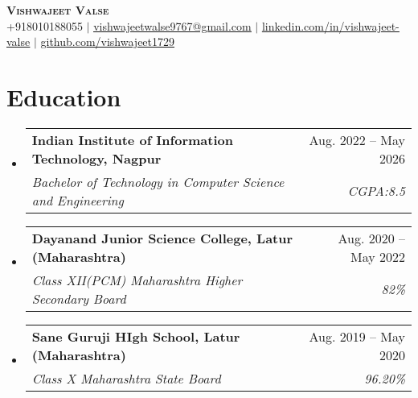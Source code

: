 \documentclass[letterpaper,11pt]{article}
\makeatletter
\newcommand{\resumeSubheading}[4]{
  \vspace{-2pt}\item
    \begin{tabular*}{0.97\textwidth}[t]{l@{\extracolsep{\fill}}r}
      \textbf{#1} & #2 \\
      \textit{\small#3} & \textit{\small #4} \\
    \end{tabular*}\vspace{-7pt}
}
\newcommand{\resumeSubHeadingListStart}{\begin{itemize}[leftmargin=0.15in, label={}]}
\newcommand{\resumeSubHeadingListEnd}{\end{itemize}}
\makeatother
\begin{document}

\begin{center}
    \textbf{\Huge \scshape Vishwajeet Valse} \\ \vspace{1pt}
    \small +918010188055 $|$ \href{mailto:vishwajeetwalse9767@gmail.com}{\underline{vishwajeetwalse9767@gmail.com}} $|$ 
    \href{https://linkedin.com/in/vishwajeet-valse-a17a94253}{\underline{linkedin.com/in/vishwajeet-valse}} $|$
    \href{https://github.com/vishwajeet1729}{\underline{github.com/vishwajeet1729}}
\end{center}


\section{Education}
  \resumeSubHeadingListStart
    \resumeSubheading
      {Indian Institute of Information Technology, Nagpur}{Aug. 2022 -- May 2026}
      {Bachelor of Technology in Computer Science and Engineering}{CGPA:8.5}
    \resumeSubheading
      {Dayanand Junior Science College, Latur (Maharashtra) }{Aug. 2020 -- May 2022  }
      {Class XII(PCM) Maharashtra Higher Secondary Board }{ 82\%}

       \resumeSubheading
         {Sane Guruji HIgh School, Latur (Maharashtra) }{Aug. 2019 -- May 2020  }
      {Class X Maharashtra State Board  }{ 96.20\%}
  \resumeSubHeadingListEnd

  


\end{document}
